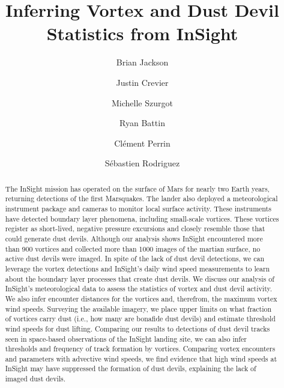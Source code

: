 \documentclass{aastex63}
\begin{document}
\title{Inferring Vortex and Dust Devil Statistics from InSight}


\author[0000-0002-9495-9700]{Brian Jackson}
\author{Justin Crevier}
\author{Michelle Szurgot}
\author{Ryan Battin}
\author[0000-0002-7200-5682]{Cl\'{e}ment Perrin}
\author[0000-0003-1219-0641]{S\'{e}bastien Rodriguez}

\begin{abstract}
The InSight mission has operated on the surface of Mars for nearly two Earth years, returning detections of the first Marsquakes. The lander also deployed a meteorological instrument package and cameras to monitor local surface activity. These instruments have detected boundary layer phenomena, including small-scale vortices. These vortices register as short-lived, negative pressure excursions and closely resemble those that could generate dust devils. Although our analysis shows InSight encountered more than 900 vortices and collected more than 1000 images of the martian surface, no active dust devils were imaged. In spite of the lack of dust devil detections, we can leverage the vortex detections and InSight’s daily wind speed measurements to learn about the boundary layer processes that create dust devils. We discuss our analysis of InSight’s meteorological data to assess the statistics of vortex and dust devil activity. We also infer encounter distances for the vortices and, therefrom, the maximum vortex wind speeds. Surveying the available imagery, we place upper limits on what fraction of vortices carry dust (i.e., how many are bonafide dust devils) and estimate threshold wind speeds for dust lifting. Comparing our results to detections of dust devil tracks seen in space-based observations of the InSight landing site, we can also infer thresholds and frequency of track formation by vortices. Comparing vortex encounters and parameters with advective wind speeds, we find evidence that high wind speeds at InSight may have suppressed the formation of dust devils, explaining the lack of imaged dust devils.
\end{abstract}
\end{document}
